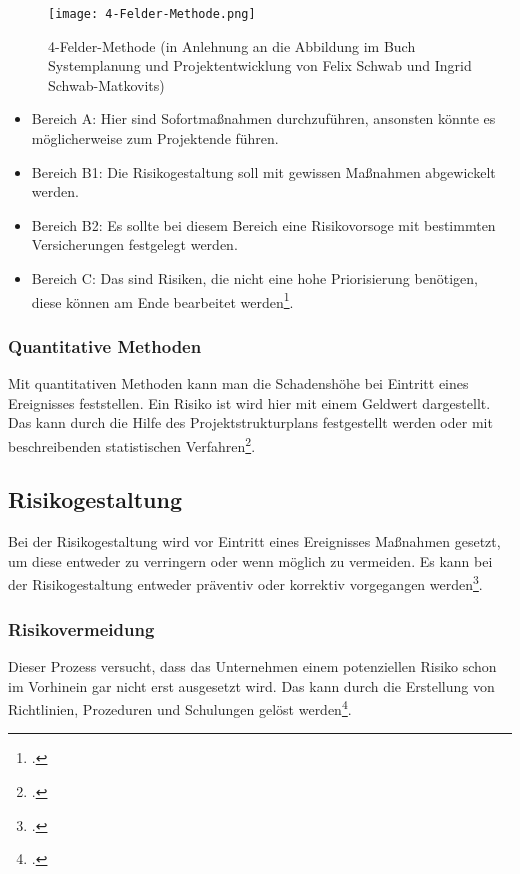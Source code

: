 \begin{center}
\begin{figure}[H]
    \centering
    \texttt{[image: 4-Felder-Methode.png]}
    \caption{4-Felder-Methode (in Anlehnung an die Abbildung im Buch Systemplanung und Projektentwicklung von Felix Schwab und Ingrid Schwab-Matkovits)}
\end{figure}
\end{center}
\begin{itemize}
	\item Bereich A: Hier sind Sofortmaßnahmen durchzuführen, ansonsten könnte es möglicherweise zum Projektende führen.
	\item Bereich B1: Die Risikogestaltung soll mit gewissen Maßnahmen abgewickelt werden.
	\item Bereich B2: Es sollte bei diesem Bereich eine Risikovorsoge mit bestimmten Versicherungen festgelegt werden.
	\item Bereich C: Das sind Risiken, die nicht eine hohe Priorisierung benötigen, diese können am Ende bearbeitet werden\footcite{risikomanagement-diplomarbeit}.
\end{itemize}

\subsubsection{Quantitative Methoden}
Mit quantitativen Methoden kann man die Schadenshöhe bei Eintritt eines Ereignisses feststellen. Ein Risiko ist wird hier mit einem Geldwert dargestellt.
Das kann durch die Hilfe des Projektstrukturplans festgestellt werden oder mit beschreibenden statistischen Verfahren\footcite{risikomanagement-diplomarbeit}.


\subsection{Risikogestaltung}
Bei der Risikogestaltung wird vor Eintritt eines Ereignisses Maßnahmen gesetzt, um diese entweder zu verringern oder wenn möglich zu vermeiden.
Es kann bei der Risikogestaltung entweder präventiv oder korrektiv vorgegangen werden\footcite{risikomanagement-diplomarbeit}.

\subsubsection{Risikovermeidung}
Dieser Prozess versucht, dass das Unternehmen einem potenziellen Risiko schon im Vorhinein gar nicht erst ausgesetzt wird. Das kann durch die Erstellung von Richtlinien, Prozeduren und Schulungen gelöst werden\footcite{risikomanagement-diplomarbeit}.

